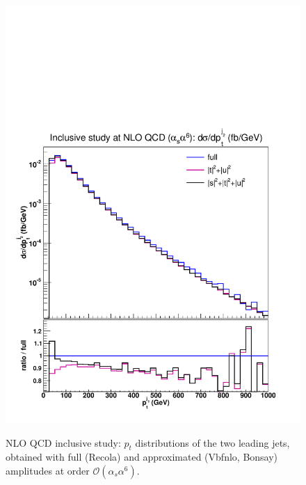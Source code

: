 \begin{figure}[hbt]
{\includegraphics[scale=0.35]{figures/scanfigures/ptj2_nlo.pdf}}
\caption{NLO QCD inclusive study: $p_t$ distributions of the two leading jets, obtained with full ({\sc Recola}) and approximated ({\sc Vbfnlo, Bonsay}) amplitudes at order $\mathcal{O}(\alpha_s\alpha^6)$.} \label{fig:mjjdyjj_1d_2}
\end{figure}

